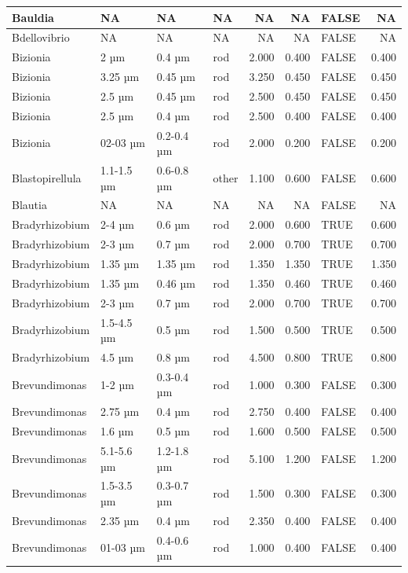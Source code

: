 \documentclass[
]{article}
\begin{document}
\begin{table}
\begin{tabular}{l|l|l|l|r|r|l|r}
\hline
Bauldia & NA & NA & NA & NA & NA & FALSE & NA\\
\hline
Bdellovibrio & NA & NA & NA & NA & NA & FALSE & NA\\
\hline
Bizionia & 2 µm & 0.4 µm & rod & 2.000 & 0.400 & FALSE & 0.400\\
\hline
Bizionia & 3.25 µm & 0.45 µm & rod & 3.250 & 0.450 & FALSE & 0.450\\
\hline
Bizionia & 2.5 µm & 0.45 µm & rod & 2.500 & 0.450 & FALSE & 0.450\\
\hline
Bizionia & 2.5 µm & 0.4 µm & rod & 2.500 & 0.400 & FALSE & 0.400\\
\hline
Bizionia & 02-03 µm & 0.2-0.4 µm & rod & 2.000 & 0.200 & FALSE & 0.200\\
\hline
Blastopirellula & 1.1-1.5 µm & 0.6-0.8 µm & other & 1.100 & 0.600 & FALSE & 0.600\\
\hline
Blautia & NA & NA & NA & NA & NA & FALSE & NA\\
\hline
Bradyrhizobium & 2-4 µm & 0.6 µm & rod & 2.000 & 0.600 & TRUE & 0.600\\
\hline
Bradyrhizobium & 2-3 µm & 0.7 µm & rod & 2.000 & 0.700 & TRUE & 0.700\\
\hline
Bradyrhizobium & 1.35 µm & 1.35 µm & rod & 1.350 & 1.350 & TRUE & 1.350\\
\hline
Bradyrhizobium & 1.35 µm & 0.46 µm & rod & 1.350 & 0.460 & TRUE & 0.460\\
\hline
Bradyrhizobium & 2-3 µm & 0.7 µm & rod & 2.000 & 0.700 & TRUE & 0.700\\
\hline
Bradyrhizobium & 1.5-4.5 µm & 0.5 µm & rod & 1.500 & 0.500 & TRUE & 0.500\\
\hline
Bradyrhizobium & 4.5 µm & 0.8 µm & rod & 4.500 & 0.800 & TRUE & 0.800\\
\hline
Brevundimonas & 1-2 µm & 0.3-0.4 µm & rod & 1.000 & 0.300 & FALSE & 0.300\\
\hline
Brevundimonas & 2.75 µm & 0.4 µm & rod & 2.750 & 0.400 & FALSE & 0.400\\
\hline
Brevundimonas & 1.6 µm & 0.5 µm & rod & 1.600 & 0.500 & FALSE & 0.500\\
\hline
Brevundimonas & 5.1-5.6 µm & 1.2-1.8 µm & rod & 5.100 & 1.200 & FALSE & 1.200\\
\hline
Brevundimonas & 1.5-3.5 µm & 0.3-0.7 µm & rod & 1.500 & 0.300 & FALSE & 0.300\\
\hline
Brevundimonas & 2.35 µm & 0.4 µm & rod & 2.350 & 0.400 & FALSE & 0.400\\
\hline
Brevundimonas & 01-03 µm & 0.4-0.6 µm & rod & 1.000 & 0.400 & FALSE & 0.400\\

\end{tabular}
\end{table}
\end{document}
